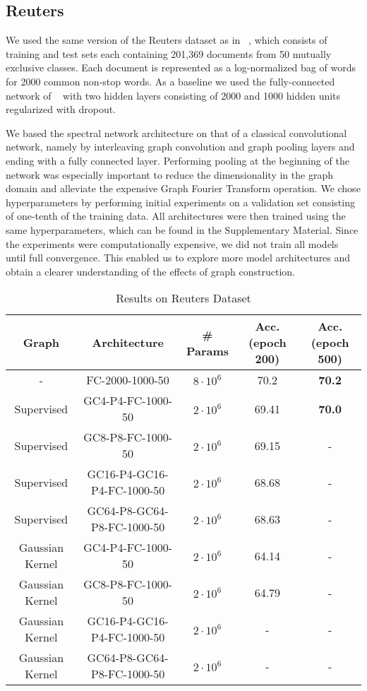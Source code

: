\subsection{Reuters}

We used the same version of the Reuters dataset as in ~\cite{Hinton2012}, which consists of training and test sets each containing 201,369 documents from 50 mutually exclusive classes. Each document is represented as a log-normalized bag of words for 2000 common non-stop words. As a baseline we used the fully-connected network of ~\cite{Hinton2012} with two hidden layers consisting of 2000 and 1000 hidden units regularized with dropout.  

We based the spectral network architecture on that of a classical convolutional network, namely by interleaving graph convolution and graph pooling layers and ending with a fully connected layer. Performing pooling at the beginning of the network was especially important to reduce the dimensionality in the graph domain and alleviate the expensive Graph Fourier Transform operation.  We chose hyperparameters by performing initial experiments on a validation set consisting of one-tenth of the training data. All architectures were then trained using the same hyperparameters, which can be found in the Supplementary Material. 
Since the experiments were computationally expensive, we did not train all models until full convergence. This enabled us to explore more model architectures and obtain a clearer understanding of the effects of graph construction.  

\begin{table}
\begin{center}
 
\begin{tabular}{|c|c|c|c|c|}
\hline
Graph & Architecture & \# Params & Acc. (epoch 200) & Acc. (epoch 500)\\
\hline
- &FC-2000-1000-50 & $8 \cdot 10^6$ & 70.2 & {\bf 70.2} \\
Supervised & GC4-P4-FC-1000-50 & $2\cdot 10^6$ & 69.41 & {\bf 70.0} \\
Supervised & GC8-P8-FC-1000-50 & $2 \cdot 10^6$ & 69.15 & - \\
Supervised & GC16-P4-GC16-P4-FC-1000-50 & $2 \cdot 10^6$ & 68.68 & - \\
Supervised &GC64-P8-GC64-P8-FC-1000-50 & $2 \cdot 10^6$ & 68.63 & - \\
Gaussian Kernel & GC4-P4-FC-1000-50 & $2\cdot 10^6$ & 64.14 & - \\
Gaussian Kernel & GC8-P8-FC-1000-50 & $2 \cdot 10^6$ & 64.79 & - \\
Gaussian Kernel & GC16-P4-GC16-P4-FC-1000-50 & $2 \cdot 10^6$ & - & - \\
Gaussian Kernel & GC64-P8-GC64-P8-FC-1000-50 & $2 \cdot 10^6$ & - & - \\
\hline
\end{tabular}
\end{center}
\caption{Results on Reuters Dataset}
\label{reutersresults}
\end{table}


